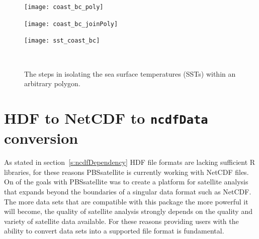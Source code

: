 \documentclass[11pt]{report}
\begin{document}
\begin{figure}[!h]
  \centering
  \begin{minipage}[b]{0.32\linewidth}
    \centering
    \texttt{[image: coast\_bc\_poly]}
  \end{minipage}\hfill
  \begin{minipage}[b]{0.32\linewidth}
    \centering
    \texttt{[image: coast\_bc\_joinPoly]}
  \end{minipage}\hfill
  \begin{minipage}[b]{0.32\linewidth}
    \centering
    \texttt{[image: sst\_coast\_bc]}
  \end{minipage}\\
  \begin{minipage}[t]{0.32\linewidth}
    \centering
  \end{minipage}\hfill
  \begin{minipage}[t]{0.32\linewidth}
    \centering
  \end{minipage}\hfill
  \begin{minipage}[t]{0.32\linewidth}
    \centering
  \end{minipage}
  \caption{
    The steps in isolating the sea surface temperatures (SSTs) within an arbitrary polygon.
  }
  \label{fig:coast_bc_sst}
\end{figure}

\section{HDF to NetCDF to \texttt{ncdfData} conversion}

As stated in section~\ref{s:ncdfDependency} HDF file formats are lacking sufficient R libraries, for these reasons PBSsatellite is currently working with NetCDF files.
On of the goals with PBSsatellite was to create a platform for satellite analysis that expands beyond the boundaries of a singular data format such as NetCDF.
The more data sets that are compatible with this package the more powerful it will become, the quality of satellite analysis strongly depends on the quality and variety of satellite data available. 
For these reasons providing users with the ability to convert data sets into a supported file format is fundamental.
\end{document}
